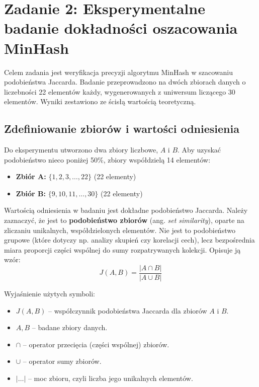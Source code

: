 \documentclass[12pt,a4paper]{article}
\begin{document}
\section{Zadanie 2: Eksperymentalne badanie dokładności oszacowania MinHash}

Celem zadania jest weryfikacja precyzji algorytmu MinHash w szacowaniu podobieństwa Jaccarda. Badanie przeprowadzono na dwóch zbiorach danych o liczebności 22 elementów każdy, wygenerowanych z uniwersum liczącego 30 elementów. Wyniki zestawiono ze ścisłą wartością teoretyczną.

\subsection{Zdefiniowanie zbiorów i wartości odniesienia}

Do eksperymentu utworzono dwa zbiory liczbowe, $A$ i $B$. Aby uzyskać podobieństwo nieco poniżej 50\%, zbiory współdzielą 14 elementów:
\begin{itemize}
    \item \textbf{Zbiór A:} $\{1, 2, 3, \dots, 22\}$ (22 elementy)
    \item \textbf{Zbiór B:} $\{9, 10, 11, \dots, 30\}$ (22 elementy)
\end{itemize}

Wartością odniesienia w badaniu jest dokładne podobieństwo Jaccarda. Należy zaznaczyć, że jest to \textbf{podobieństwo zbiorów} (ang. \textit{set similarity}), oparte na zliczaniu unikalnych, współdzielonych elementów. Nie jest to podobieństwo grupowe (które dotyczy np. analizy skupień czy korelacji cech), lecz bezpośrednia miara proporcji części wspólnej do sumy rozpatrywanych kolekcji. Opisuje ją wzór:
\begin{equation}
J(A, B) = \frac{|A \cap B|}{|A \cup B|}
\end{equation}

Wyjaśnienie użytych symboli:
\begin{itemize}
    \item $J(A, B)$ -- współczynnik podobieństwa Jaccarda dla zbiorów $A$ i $B$.
    \item $A, B$ -- badane zbiory danych.
    \item $\cap$ -- operator przecięcia (części wspólnej) zbiorów.
    \item $\cup$ -- operator sumy zbiorów.
    \item $|\dots|$ -- moc zbioru, czyli liczba jego unikalnych elementów.
\end{itemize}
\end{document}

